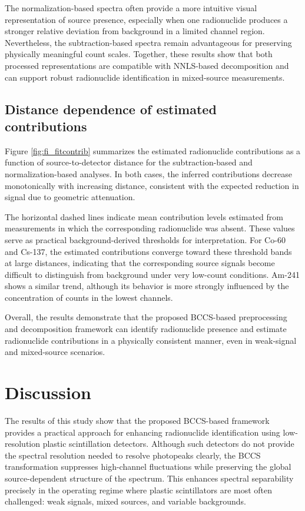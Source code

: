 \documentclass[fleqn, 10pt]{wlscirep}
\begin{document}
The normalization-based spectra often provide a more intuitive visual representation of source presence, especially when one radionuclide produces a stronger relative deviation from background in a limited channel region. Nevertheless, the subtraction-based spectra remain advantageous for preserving physically meaningful count scales. Together, these results
show that both processed representations are compatible with NNLS-based decomposition and can support robust radionuclide identification in mixed-source measurements.

\subsection*{Distance dependence of estimated contributions}

Figure \ref{fig:fi_fitcontrib} summarizes the estimated radionuclide contributions as a function of source-to-detector distance for the subtraction-based and normalization-based analyses. In both cases, the inferred contributions decrease monotonically with increasing distance, consistent with the expected reduction in signal due to geometric attenuation. 

The horizontal dashed lines indicate mean contribution levels estimated from measurements in which the corresponding radionuclide was absent. These values serve as practical background-derived thresholds for interpretation. For Co-60 and Cs-137, the estimated contributions converge toward these threshold bands at large distances, indicating that the corresponding source signals become difficult to distinguish from background under very low-count conditions. Am-241 shows a similar trend, although its behavior is more strongly influenced by the concentration of counts in the lowest channels.

Overall, the results demonstrate that the proposed BCCS-based preprocessing and decomposition framework can identify radionuclide presence and estimate radionuclide contributions in a physically consistent manner, even in weak-signal and mixed-source scenarios.

\section*{Discussion}

The results of this study show that the proposed BCCS-based framework provides a practical approach for enhancing radionuclide identification using low-resolution plastic scintillation detectors. Although such detectors do not provide the spectral resolution needed to resolve photopeaks clearly, the BCCS transformation suppresses high-channel fluctuations while preserving the global source-dependent structure of the spectrum. This enhances spectral separability precisely in the operating regime where plastic scintillators are most often challenged: weak signals, mixed sources, and variable backgrounds.
\end{document}
